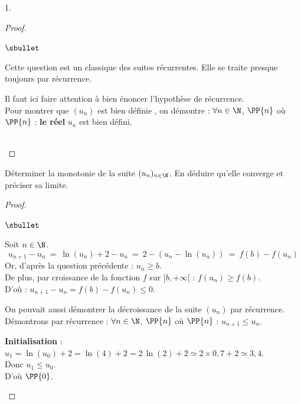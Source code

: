 \documentclass[11pt]{article}%
\begin{document}
\begin{noliste}{1.}
\begin{proof}
    \begin{remark}
     \begin{noliste}{$\sbullet$}
      \item Cette question est un classique des suites récurrentes. 
      Elle se traite presque toujours par récurrence.
      
      \item Il faut ici faire attention à bien énoncer l'hypothèse de 
      récurrence. \\
      Pour montrer que  $(u_n)$ est bien 
      définie \fg{}, on démontre : $\forall n \in \N$, $\PP{n}$ 
      \quad où \quad $\PP{n}$ : {\bf le réel} $u_n$ est bien défini.
     \end{noliste}
    \end{remark}~\\[-1.4cm]
  \end{proof}

  
  \item Déterminer la monotonie de la suite $(u_n)_{n\in \N}$. En 
  déduire qu'elle converge et préciser sa limite.
  
  \begin{proof}~
    \begin{noliste}{$\sbullet$}
      \item Soit $n\in \N$.
      \[
        u_{n+1} - u_n \ = \ \ln(u_n) +2 -u_n \ = \ 
        2- (u_n - \ln(u_n)) \ = \ f(b) - f(u_n)
      \]
      Or, d'après la question précédente : $u_n \geq b$.\\
      De plus, par croissance de la fonction $f$ sur $[b,+\infty[$ :
      $f(u_n) \geq f(b)$.\\
      D'où : $u_{n+1} - u_n = f(b)-f(u_n) \leq 0$.
      
      
      \newpage
      
      
      \begin{remark}
        On pouvait aussi démontrer la décroissance de la suite 
        $(u_n)$ par récurrence.\\
        Démontrons par récurrence : $\forall n\in \N$, $\PP{n}$ 
      \quad où \quad $\PP{n}$ : $u_{n+1} \leq u_n$.
      \begin{noliste}{\fitem}
	\item {\bf Initialisation} :\\
	$u_1 = \ln(u_0) +2 = \ln(4) + 2 = 2 \, \ln(2)+2 \simeq 
	2 \times 0,7 +2 \simeq 3,4$.\\
	Donc $u_1 \leq u_0$.\\
	D'où $\PP{0}$.
	

\end{noliste}
\end{remark}
\end{noliste}
\end{proof}
\end{noliste}
\end{document}
